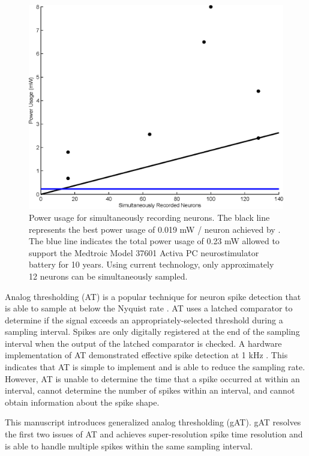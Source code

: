 \documentclass[10 pt]{article}
\begin{document}
\begin{figure}[htbp]
\begin{center}
\includegraphics[scale=0.30]{power.eps}
\caption{Power usage for simultaneously recording neurons. The black line represents the best power usage of 0.019 mW / neuron achieved by \cite{???}. The blue line indicates the total power usage of 0.23 mW allowed to support the Medtroic Model 37601 Activa PC neurostimulator battery for 10 years. Using current technology, only approximately 12 neurons can be simultaneously sampled.}
\label{fig:power}
\end{center}
\end{figure}

Analog thresholding (AT) is a popular technique for neuron spike detection that is able to sample at below the Nyquist rate \cite{???}.
AT uses a latched comparator to determine if the signal exceeds an appropriately-selected threshold during a sampling interval.
Spikes are only digitally registered at the end of the sampling interval when the output of the latched comparator is checked.
A hardware implementation of AT demonstrated effective spike detection at 1 kHz \cite{???}.
This indicates that AT is simple to implement and is able to reduce the sampling rate.
However, AT is unable to determine the time that a spike occurred at within an interval, cannot determine the number of spikes within an interval, and cannot obtain information about the spike shape.

This manuscript introduces generalized analog thresholding (gAT).
gAT resolves the first two issues of AT and achieves super-resolution spike time resolution and is able to handle multiple spikes within the same sampling interval.
\end{document}

